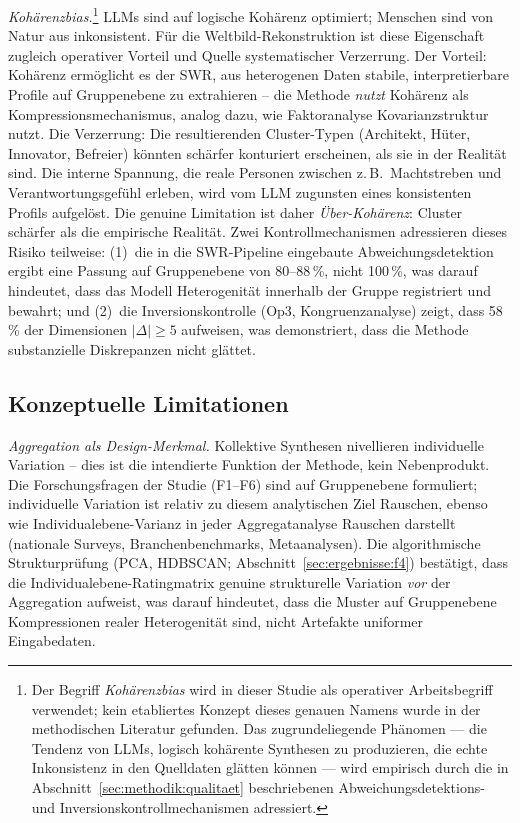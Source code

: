 \documentclass[12pt,a4paper]{article}
\begin{document}
\emph{Koh\"arenzbias.}\footnote{Der Begriff \emph{Koh\"arenzbias} wird in dieser Studie als operativer Arbeitsbegriff verwendet; kein etabliertes Konzept dieses genauen Namens wurde in der methodischen Literatur gefunden. Das zugrundeliegende Ph\"anomen --- die Tendenz von LLMs, logisch koh\"arente Synthesen zu produzieren, die echte Inkonsistenz in den Quelldaten gl\"atten k\"onnen --- wird empirisch durch die in Abschnitt~\ref{sec:methodik:qualitaet} beschriebenen Abweichungsdetektions- und Inversionskontrollmechanismen adressiert.} LLMs sind auf logische Koh\"arenz optimiert; Menschen sind von Natur aus inkonsistent. F\"ur die Weltbild-Rekonstruktion ist diese Eigenschaft zugleich operativer Vorteil und Quelle systematischer Verzerrung. Der Vorteil: Koh\"arenz erm\"oglicht es der SWR, aus heterogenen Daten stabile, interpretierbare Profile auf Gruppenebene zu extrahieren -- die Methode \emph{nutzt} Koh\"arenz als Kompressionsmechanismus, analog dazu, wie Faktoranalyse Kovarianzstruktur nutzt. Die Verzerrung: Die resultierenden Cluster-Typen (Architekt, H\"uter, Innovator, Befreier) k\"onnten sch\"arfer konturiert erscheinen, als sie in der Realit\"at sind. Die interne Spannung, die reale Personen zwischen z.\,B.\ Machtstreben und Verantwortungsgef\"uhl erleben, wird vom LLM zugunsten eines konsistenten Profils aufgel\"ost. Die genuine Limitation ist daher \emph{\"Uber-Koh\"arenz}: Cluster sch\"arfer als die empirische Realit\"at. Zwei Kontrollmechanismen adressieren dieses Risiko teilweise: (1)~die in die SWR-Pipeline eingebaute Abweichungsdetektion ergibt eine Passung auf Gruppenebene von 80--88\,\%, nicht 100\,\%, was darauf hindeutet, dass das Modell Heterogenit\"at innerhalb der Gruppe registriert und bewahrt; und (2)~die Inversionskontrolle (Op3, Kongruenzanalyse) zeigt, dass 58\,\% der Dimensionen $|\Delta| \geq 5$ aufweisen, was demonstriert, dass die Methode substanzielle Diskrepanzen nicht gl\"attet.


\subsection{Konzeptuelle Limitationen}

\emph{Aggregation als Design-Merkmal.} Kollektive Synthesen nivellieren individuelle Variation -- dies ist die intendierte Funktion der Methode, kein Nebenprodukt. Die Forschungsfragen der Studie (F1--F6) sind auf Gruppenebene formuliert; individuelle Variation ist relativ zu diesem analytischen Ziel Rauschen, ebenso wie Individualebene-Varianz in jeder Aggregatanalyse Rauschen darstellt (nationale Surveys, Branchenbenchmarks, Metaanalysen). Die algorithmische Strukturpr\"ufung (PCA, HDBSCAN; Abschnitt~\ref{sec:ergebnisse:f4}) best\"atigt, dass die Individualebene-Ratingmatrix genuine strukturelle Variation \emph{vor} der Aggregation aufweist, was darauf hindeutet, dass die Muster auf Gruppenebene Kompressionen realer Heterogenit\"at sind, nicht Artefakte uniformer Eingabedaten.
\end{document}
